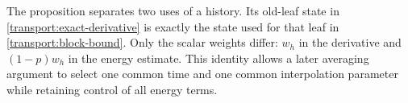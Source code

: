 The proposition separates two uses of a history.  Its old-leaf state
in \eqref{transport:exact-derivative} is exactly the state used for that
leaf in \eqref{transport:block-bound}.  Only the scalar weights differ:
$w_h$ in the derivative and $(1-p)w_h$ in the energy estimate.  This
identity allows a later averaging argument to select one common time
and one common interpolation parameter while retaining control of all
energy terms.
